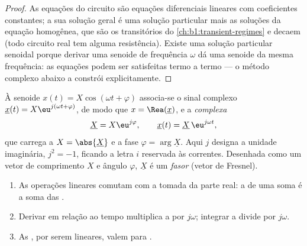 \begin{proof}
As equações do circuito são equações diferenciais lineares com coeficientes
constantes; a sua solução geral é uma solução particular mais as
soluções da equação homogênea, que são os transitórios do
\cref{ch:b1:transient-regimes} e decaem (todo circuito real tem alguma
resistência). Existe uma solução particular senoidal porque
derivar uma senoide de frequência $\omega$ dá uma senoide da
mesma frequência: as equações podem ser satisfeitas termo a termo --- o
método complexo abaixo a constrói explicitamente.
\end{proof}

\begin{definition}\label{def:b1:sinusoidal-impedance:complex}
À senoide $x(t) = X\cos(\omega t + \varphi)$ associa-se o
sinal complexo $\underline{x}(t) = X\eu^{j(\omega t + \varphi)}$, de modo que
$x = \Rea(\underline{x})$, e a \emph{ complexa}
\[
\underline{X} = X\eu^{j\varphi}, \qquad \underline{x}(t) = \underline{X}\,\eu^{j\omega t},
\]
que carrega a  $X = \abs{\underline{X}}$ e a fase
$\varphi = \arg\underline{X}$. Aqui $j$ designa a unidade imaginária,
$j^2 = -1$, ficando a letra $i$ reservada às correntes. Desenhada como um
vetor de comprimento $X$ e ângulo $\varphi$, $\underline{X}$ é um
\emph{fasor} (vetor de Fresnel).
\end{definition}

\begin{proposition}\label{prop:b1:sinusoidal-impedance:rules}
\begin{enumerate}
  \item As operações lineares comutam com a tomada da parte real: a
         de uma soma é a soma das .
  \item Derivar em relação ao tempo multiplica a  por $j\omega$; integrar a divide por $j\omega$.
  \item As , por serem lineares, valem para .
\end{enumerate}
\end{proposition}

